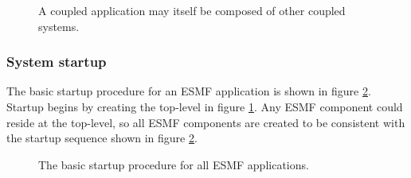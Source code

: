 \begin{figure}
\caption[{Scoping of Components in a Coupled Application}]{A coupled
application may itself be composed of other coupled systems.}
\label{fig:couplerscaling}
\end{figure}

\subsubsection{System startup}

The basic startup procedure for an ESMF application is shown in figure \ref{fig:ESMFApplicationMain}. Startup
begins by creating the top-level in figure \ref{fig:couplerscaling}. Any ESMF component could reside at the top-level, so
all ESMF components are created to be consistent with the startup sequence shown in figure \ref{fig:ESMFApplicationMain}.

\begin{figure}
\caption[{ESMF Boot Up Stage}]{The basic startup procedure for
all ESMF applications.}
\label{fig:ESMFApplicationMain}
\end{figure}

